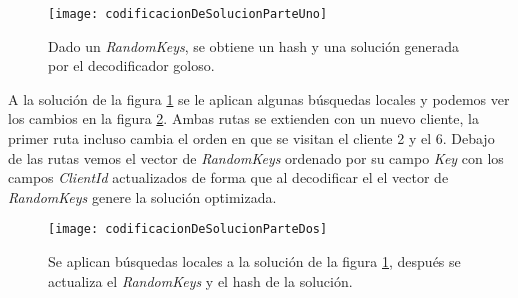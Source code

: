 \bigskip

\begin{figure}[h]
	\caption{Dado un \textit{RandomKeys}, se obtiene un hash y una solución generada por el decodificador goloso.}
	\centering
	\texttt{[image: codificacionDeSolucionParteUno]}
	\label{fig:codificacionDeSolucionUno}
\end{figure}

\bigskip

A la solución de la figura \ref{fig:codificacionDeSolucionUno} se le aplican algunas búsquedas locales y podemos ver los cambios en la figura \ref{fig:codificacionDeSolucionDos}. Ambas rutas se extienden con un nuevo cliente, la primer ruta incluso cambia el orden en que se visitan el cliente 2 y el 6. Debajo de las rutas vemos el vector de \textit{RandomKeys} ordenado por su campo \textit{Key} con los campos \textit{ClientId} actualizados de forma que al decodificar el el vector de \textit{RandomKeys} genere la solución optimizada.

\bigskip

\begin{figure}[h]
    \caption{Se aplican búsquedas locales a la solución de la figura \ref{fig:codificacionDeSolucionUno}, después se actualiza el \textit{RandomKeys} y el hash de la solución. }
    \centering
    \texttt{[image: codificacionDeSolucionParteDos]}
    \label{fig:codificacionDeSolucionDos}
\end{figure} 

